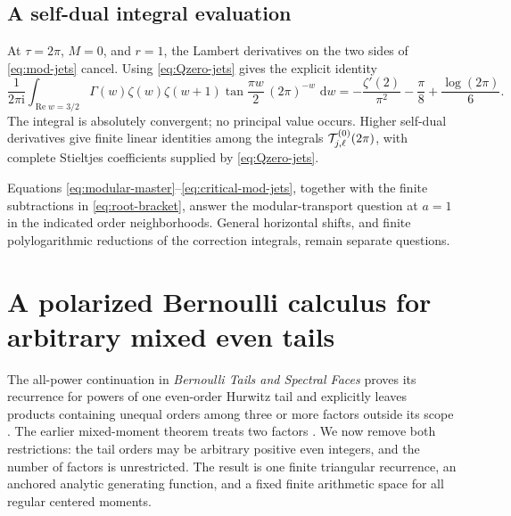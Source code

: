 \documentclass[11pt,letterpaper]{article}
\numberwithin{equation}{section}
\theoremstyle{definition}
\theoremstyle{remark}
\DeclareMathOperator{\Ree}{Re}
\newcommand{\ii}{\mathrm i}
\newcommand{\dd}{\,\mathrm d}
\begin{document}
\subsection{A self-dual integral evaluation}

At \(\tau=2\pi\), \(M=0\), and \(r=1\), the Lambert
derivatives on the two sides of \eqref{eq:mod-jets} cancel.
Using \eqref{eq:Qzero-jets} gives the explicit identity
\begin{equation}\label{eq:self-dual-integral}
 \boxed{\displaystyle
 \frac1{2\pi\ii}\int_{\Ree w=3/2}
   \Gamma(w)\zeta(w)\zeta(w+1)
      \tan\frac{\pi w}{2}\,(2\pi)^{-w}\,\dd w
 =-\frac{\zeta'(2)}{\pi^2}-\frac{\pi}{8}
                              +\frac{\log(2\pi)}6.}
\end{equation}
The integral is absolutely convergent; no principal value occurs.
Higher self-dual derivatives give finite linear identities among
the integrals \({\cal T}_{j,\ell}^{(0)}(2\pi)\), with complete
Stieltjes coefficients supplied by \eqref{eq:Qzero-jets}.

Equations \eqref{eq:modular-master}--\eqref{eq:critical-mod-jets},
together with the finite subtractions in \eqref{eq:root-bracket},
answer the modular-transport question at \(a=1\) in the indicated
order neighborhoods. General horizontal shifts, and finite
polylogarithmic reductions of the correction integrals, remain
separate questions.




\section{A polarized Bernoulli calculus for arbitrary mixed even tails}
\label{mtp:section}

The all-power continuation in \emph{Bernoulli Tails and Spectral Faces}
proves its recurrence for powers of one even-order Hurwitz tail and
explicitly leaves products containing unequal orders among three or
more factors outside its scope \cite[Section 2, after the even-order
extension]{RepoBernoulli}. The earlier mixed-moment theorem treats
two factors \cite[Section 4]{RepoMixed}. We now remove both
restrictions: the tail orders may be arbitrary positive even integers,
and the number of factors is unrestricted. The result is one finite
triangular recurrence, an anchored analytic generating function, and a
fixed finite arithmetic space for all regular centered moments.
\end{document}
